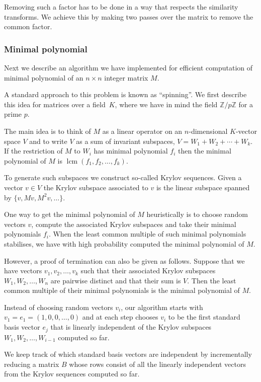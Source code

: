 \documentclass{sig-alternate-05-2015}
\DeclareMathOperator{\lcm}{lcm}
\begin{document}
Removing such a factor has to be done in a way that respects the
similarity transforms. We achieve this by making two passes over the matrix
to remove the common factor.

\subsubsection{Minimal polynomial}

Next we describe an algorithm we have implemented for efficient
computation of minimal polynomial of an $n\times n$ integer matrix $M$.

A standard approach to this problem is known as ``spinning''. 
We first describe this idea for matrices over a field~$K$, where we have
in mind the field $\mathbb{Z}/p\mathbb{Z}$ for a prime $p$.

The main idea is to think of $M$ as a linear operator on an $n$-dimensional
$K$-vector space $V$ and to write $V$ as a sum of invariant subspaces, 
$V = W_1 + W_2 + \cdots + W_k$. If the restriction of $M$ to $W_i$ has
minimal polynomial $f_i$ then the minimal polynomial of $M$ is
$\lcm(f_1, f_2, \ldots, f_k)$.

To generate such subspaces we construct so-called Krylov sequences. Given
a vector $v \in V$ the Krylov subspace associated to $v$ is the linear
subspace spanned by $\{v, Mv, M^2v, \ldots\}$.

One way to get the minimal polynomial of $M$ heuristically is to choose
random vectors $v$, compute the associated Krylov subspaces and take their
minimal polynomials $f_i$. When the least common multiple of such minimal
polynomials stabilises, we have with high probability computed the minimal
polynomial of $M$.

However, a proof of termination can also be given as follows. Suppose that
we have vectors $v_1, v_2, \ldots, v_k$ such that their associated Krylov
subspaces $W_1, W_2, \ldots, W_n$ are pairwise distinct and that their
sum is $V$. Then the least common multiple of their minimal polynomials is
the minimal polynomial of $M$.

Instead of choosing random vectors $v_i$, our algorithm starts with
$v_1 = e_1 = (1, 0, 0, \ldots, 0)$ and at each step chooses $v_i$ to be
the first standard basis vector $e_j$ that is linearly independent of the
Krylov subspaces $W_1, W_2, \ldots, W_{i-1}$ computed so far.

We keep track of which standard basis vectors are independent by
incrementally reducing a matrix $B$ whose rows consist of all the
linearly independent vectors from the Krylov sequences computed so
far.
\end{document}
